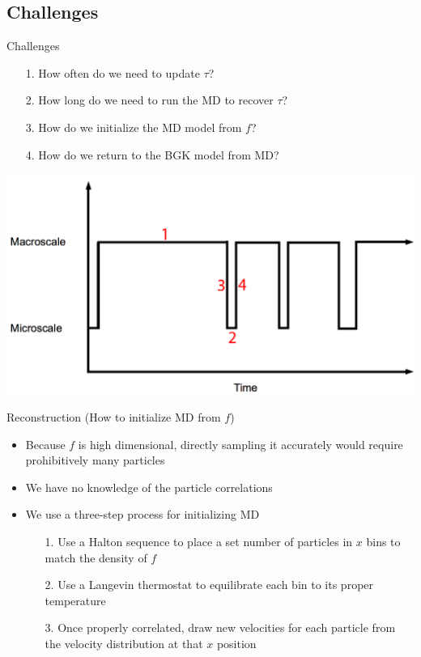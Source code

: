 \documentclass{beamer}
\begin{document}
	\subsection{Challenges}
	\begin{frame}{Challenges}
		\begin{itemize}
			\item[1. ]  How often do we need to update $\tau$?
			\item[2. ]  How long do we need to run the MD to recover $\tau$?
			\item[3. ]  How do we initialize the MD model from $f$?
			\item[4. ]  How do we return to the BGK model from MD?
		\end{itemize}
		\begin{center}
			\includegraphics[height=0.55\textheight]{scheme2.png}
		\end{center}
	\end{frame}
	
	\begin{frame}{Reconstruction (How to initialize MD from $f$)}
		\begin{itemize}
		\item Because $f$ is high dimensional, directly sampling it accurately would require prohibitively many particles
		\vspace{0.5em}
		\item We have no knowledge of the particle correlations
		\vspace{0.5em}
		\item We use a three-step process for initializing MD
		\vspace{0.5em}
		\begin{itemize}
		\item[1. ] Use a Halton sequence to place a set number of particles in $x$ bins to match the density of $f$
		\vspace{0.5em}
		\item[2. ] Use a Langevin thermostat to equilibrate each bin to its proper temperature
		\vspace{0.5em}
		\item[3. ] Once properly correlated, draw new velocities for each particle from the velocity distribution at that $x$ position
		\end{itemize}
		\end{itemize}
	\end{frame}
	
\end{document}
